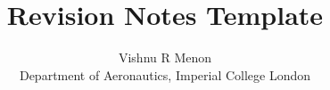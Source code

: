 \documentclass{summary_notes}
\begin{document}
\title{\textbf{Revision Notes Template}}
\author{Vishnu R Menon\\ 
\small{Department of Aeronautics, Imperial College London}}

\maketitle
\tableofcontents

\newpage


\end{document}
